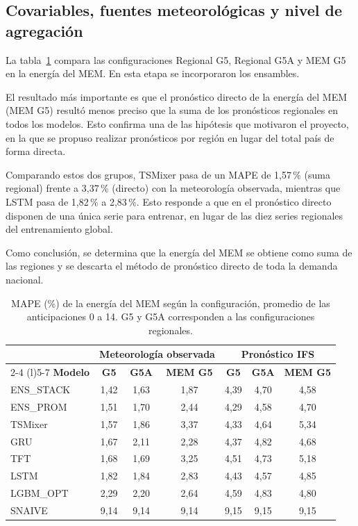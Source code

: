 \subsection{Covariables, fuentes meteorológicas y nivel de agregación}
\label{subsec:resultados_covariables}

La tabla~\ref{tab:resultados_g5} compara las configuraciones Regional G5, Regional G5A y MEM G5 en la energía del MEM. En esta etapa se incorporaron los ensambles.

El resultado más importante es que el pronóstico directo de la energía del MEM (MEM G5) resultó menos preciso que la suma de los pronósticos regionales en todos los modelos. Esto confirma una de las hipótesis que motivaron el proyecto, en la que se propuso realizar pronósticos por región en lugar del total país de forma directa.

Comparando estos dos grupos, TSMixer pasa de un MAPE de 1,57\,\% (suma regional) frente a 3,37\,\% (directo) con la meteorología observada, mientras que LSTM pasa de 1,82\,\%  a 2,83\,\%. Esto responde a que en el pronóstico directo disponen de una única serie para entrenar, en lugar de las diez series regionales del entrenamiento global. 

Como conclusión, se determina que la energía del MEM se obtiene como suma de las regiones y se descarta el método de pronóstico directo de toda la demanda nacional.

\begin{table}[H]
	\centering
	\caption{MAPE (\%) de la energía del MEM según la configuración, promedio de las anticipaciones 0 a 14. G5 y G5A corresponden a las configuraciones regionales.}
	\label{tab:resultados_g5}
	\small
	\setlength{\tabcolsep}{4pt}
	\renewcommand{\arraystretch}{1.15}
	\begin{tabular*}{\textwidth}{@{\extracolsep{\fill}}lcccccc@{}}
		\toprule
		& \multicolumn{3}{c}{\textbf{Meteorología observada}} & \multicolumn{3}{c}{\textbf{Pronóstico IFS}} \\
		\cmidrule(lr){2-4} \cmidrule(l){5-7}
		\textbf{Modelo} & \textbf{G5} & \textbf{G5A} & \textbf{MEM G5} & \textbf{G5} & \textbf{G5A} & \textbf{MEM G5} \\
		\midrule
		ENS\_STACK & 1,42 & 1,63 & 1,87 & 4,39 & 4,70 & 4,58 \\
		ENS\_PROM & 1,51 & 1,70 & 2,44 & 4,29 & 4,58 & 4,70 \\
		TSMixer & 1,57 & 1,86 & 3,37 & 4,33 & 4,64 & 5,34 \\
		GRU & 1,67 & 2,11 & 2,28 & 4,37 & 4,82 & 4,68 \\
		TFT & 1,68 & 1,69 & 3,25 & 4,51 & 4,73 & 5,18 \\
		LSTM & 1,82 & 1,84 & 2,83 & 4,43 & 4,57 & 4,85 \\
		LGBM\_OPT & 2,29 & 2,20 & 2,64 & 4,59 & 4,83 & 4,80 \\
		SNAIVE & 9,14 & 9,14 & 9,14 & 9,15 & 9,15 & 9,15 \\
		\bottomrule
	\end{tabular*}
\end{table}

